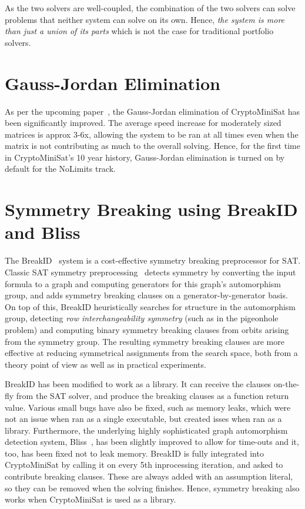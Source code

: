 \documentclass[final]{ieee}
\begin{document}
As the two solvers are well-coupled, the combination of the two solvers can solve problems that neither system can solve on its own. Hence, \emph{the system is more than just a union of its parts} which is not the case for traditional portfolio solvers.

\section{Gauss-Jordan Elimination}
As per the upcoming paper~\cite{birdtwo}, the Gauss-Jordan elimination of CryptoMiniSat has been significantly improved. The average speed increase for moderately sized matrices is approx 3-6x, allowing the system to be ran at all times even when the matrix is not contributing as much to the overall solving. Hence, for the first time in CryptoMiniSat's 10 year history, Gauss-Jordan elimination is turned on by default for the NoLimits track.


\section{Symmetry Breaking using BreakID and Bliss}
The BreakID~\cite{breakid2016} system is a cost-effective symmetry breaking preprocessor for SAT.
Classic SAT symmetry preprocessing~\cite{shatter2006} detects symmetry by converting the input formula to a graph and computing generators for this graph's automorphism group, and adds symmetry breaking clauses on a generator-by-generator basis.
On top of this, BreakID heuristically searches for structure in the automorphism group, detecting \emph{row interchangeability symmetry} (such as in the pigeonhole problem) and computing binary symmetry breaking clauses from orbits arising from the symmetry group.
The resulting symmetry breaking clauses are more effective at reducing symmetrical assignments from the search space, both from a theory point of view as well as in practical experiments.

BreakID has been modified to work as a library. It can receive the clauses on-the-fly from the SAT solver, and produce the breaking clauses as a function return value. Various small bugs have also be fixed, such as memory leaks, which were not an issue when ran as a single executable, but created isses when ran as a library. Furthermore, the underlying highly sophisticated graph automorphism detection system, Bliss~\cite{DBLP:conf/alenex/JunttilaK07}, has been slightly improved to allow for time-outs and it, too, has been fixed not to leak memory. BreakID is fully integrated into CryptoMiniSat by calling it on every 5th inprocessing iteration, and asked to contribute breaking clauses. These are always added with an assumption literal, so they can be removed when the solving finishes. Hence, symmetry breaking also works when CryptoMiniSat is used as a library.
\end{document}
